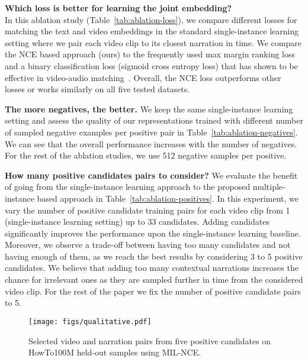 \documentclass[10pt,twocolumn,letterpaper]{article}
\begin{document}
\noindent
\textbf{Which loss is better for learning the joint embedding?}\\
In this ablation study (Table~\ref{tab:ablation-loss}), we compare different losses for matching the text and video embeddings in the
standard single-instance learning setting where we pair each video clip to its closest narration in time.
We compare the NCE based approach (ours) to the frequently used max margin ranking loss~\cite{chowdhury2018webly,dong19dual,hendricks17localizing,karpathy14deepfragment,miech18learning,mithun2018learning,wang2018learning,wang2016learning,wray2019fine,wu2017sampling} and a binary classification loss (\ie sigmoid cross entropy loss) that has shown to be effective in video-audio matching~\cite{arandjelovic17look,arandjelovic2018objects}.
Overall, the NCE loss outperforms other losses or works similarly on all five tested datasets.

\noindent
\textbf{The more negatives, the better.}
We keep the same single-instance learning setting and assess the quality of our representations trained with different number of sampled
negative examples per positive pair in Table~\ref{tab:ablation-negatives}.
We can see that the overall performance increases with the number of negatives.
For the rest of the ablation studies, we use 512 negative samples per positive.

\noindent
\textbf{How many positive candidates pairs to consider?}
We evaluate the benefit of going from the single-instance learning approach to the proposed multiple-instance based approach in 
Table~\ref{tab:ablation-positives}.
In this experiment, we vary the number of positive candidate training pairs  for each video clip from 1 (\ie single-instance learning setting) up to 33 candidates.
Adding candidates significantly improves the performance upon the single-instance learning baseline.
Moreover, we observe a trade-off between having too many candidates and not having enough of them, as we reach the best results by considering 3 to 5 positive candidates. 
We believe that adding too many contextual narrations increases the chance for irrelevant ones as they are sampled further in time from the considered video clip.
For the rest of the paper we fix the number of positive candidate pairs to 5.


\begin{figure}[t]
      \centering
		\texttt{[image: figs/qualitative.pdf]}\vspace{-0.5em}
	\caption{\label{fig:qualitative} \small Selected video and narration pairs from five positive candidates on HowTo100M held-out samples using MIL-NCE.
}
\end{figure}
\end{document}

